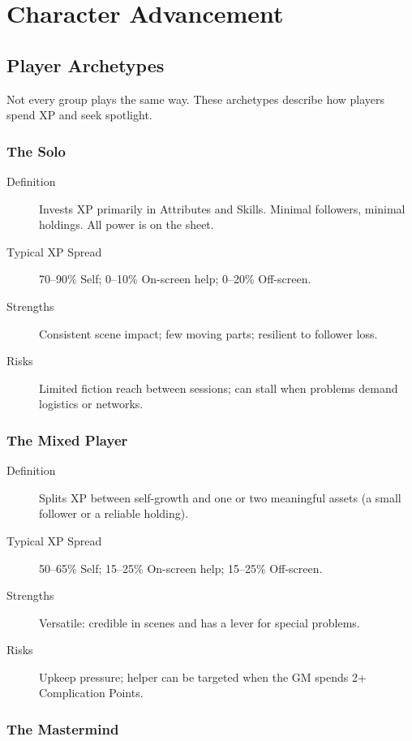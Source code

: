 \chapter{Character Advancement}

\section{Player Archetypes}

Not every group plays the same way. These archetypes describe how players spend XP and seek spotlight.

\subsection{The Solo}

\begin{description}
\item[Definition] Invests XP primarily in Attributes and Skills. Minimal followers, minimal holdings. All power is on the sheet.
\item[Typical XP Spread] 70--90\% Self; 0--10\% On-screen help; 0--20\% Off-screen.
\item[Strengths] Consistent scene impact; few moving parts; resilient to follower loss.
\item[Risks] Limited fiction reach between sessions; can stall when problems demand logistics or networks.
\end{description}

\subsection{The Mixed Player}

\begin{description}
\item[Definition] Splits XP between self-growth and one or two meaningful assets (a small follower or a reliable holding).
\item[Typical XP Spread] 50--65\% Self; 15--25\% On-screen help; 15--25\% Off-screen.
\item[Strengths] Versatile: credible in scenes and has a lever for special problems.
\item[Risks] Upkeep pressure; helper can be targeted when the GM spends 2+ Complication Points.
\end{description}

\subsection{The Mastermind}

